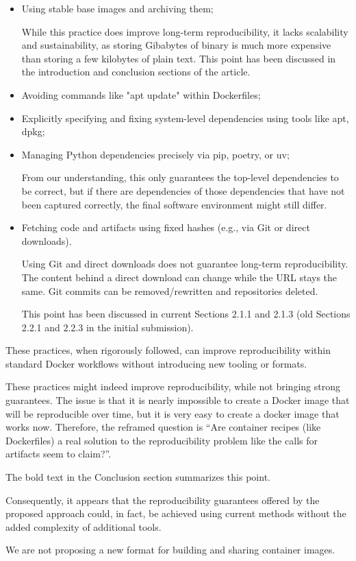 \documentclass[%
	11pt,
	final,
]{article}
\begin{document}
\begin{itemize}
\item Using stable base images and archiving them;
    \begin{review-answer} 
    While this practice does improve long-term reproducibility, it lacks scalability and sustainability, as storing Gibabytes of binary is much more expensive than storing a few kilobytes of plain text.
    This point has been discussed in the introduction and conclusion sections of the article.
  \end{review-answer}
\item Avoiding commands like "apt update" within Dockerfiles;
\item Explicitly specifying and fixing system-level dependencies using tools like apt, dpkg;
\item Managing Python dependencies precisely via pip, poetry, or uv;
  \begin{review-answer}
    From our understanding, this only guarantees the top-level dependencies to be correct, but if there are dependencies of those dependencies that have not been captured correctly, the final software environment might still differ.
  \end{review-answer}
\item Fetching code and artifacts using fixed hashes (e.g., via Git or direct downloads).
  \begin{review-answer}
    Using Git and direct downloads does not guarantee long-term reproducibility.
    The content behind a direct download can change while the URL stays the same.
    Git commits can be removed/rewritten and repositories deleted.

    This point has been discussed in current Sections 2.1.1 and 2.1.3 (old Sections 2.2.1 and 2.2.3 in the initial submission).
  \end{review-answer}
\end{itemize}

These practices, when rigorously followed, can improve reproducibility within standard Docker workflows without introducing new tooling or formats.
\begin{review-answer}
  These practices might indeed improve reproducibility, while not bringing strong guarantees.
  The issue is that it is nearly impossible to create a Docker image that will be reproducible over time, but it is very easy to create a docker image that works now.
  Therefore, the reframed question is ``Are container recipes (like Dockerfiles) a real solution to the reproducibility problem like the calls for artifacts seem to claim?''.

  The bold text in the Conclusion section summarizes this point.
\end{review-answer}
Consequently, it appears that the reproducibility guarantees offered by the proposed approach could, in fact, be achieved using current methods without the added complexity of additional tools.
\begin{review-answer}
  We are not proposing a new format for building and sharing container images.
\end{review-answer}
\end{document}
